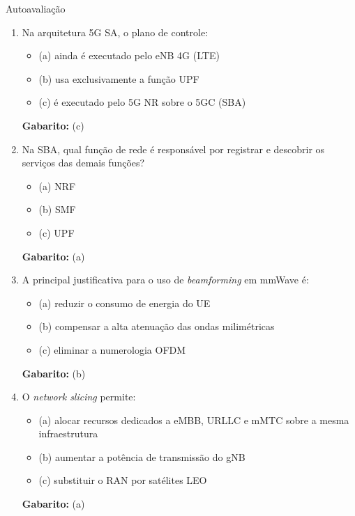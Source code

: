 \documentclass[aspectratio=169,11pt]{beamer}
\begin{document}
\begin{frame}{Autoavaliação}
  \begin{enumerate}
    \item Na arquitetura 5G SA, o plano de controle:
      \begin{itemize}
        \item (a) ainda é executado pelo eNB 4G (LTE)
        \item (b) usa exclusivamente a função UPF
        \item (c) é executado pelo 5G NR sobre o 5GC (SBA)
      \end{itemize}
      \pause
      \textbf{Gabarito:} (c)
    \item Na SBA, qual função de rede é responsável por registrar e descobrir os serviços das demais funções?
      \begin{itemize}
        \item (a) NRF
        \item (b) SMF
        \item (c) UPF
      \end{itemize}
      \pause
      \textbf{Gabarito:} (a)
    \item A principal justificativa para o uso de \emph{beamforming} em mmWave é:
      \begin{itemize}
        \item (a) reduzir o consumo de energia do UE
        \item (b) compensar a alta atenuação das ondas milimétricas
        \item (c) eliminar a numerologia OFDM
      \end{itemize}
      \pause
      \textbf{Gabarito:} (b)
    \item O \emph{network slicing} permite:
      \begin{itemize}
        \item (a) alocar recursos dedicados a eMBB, URLLC e mMTC sobre a mesma infraestrutura
        \item (b) aumentar a potência de transmissão do gNB
        \item (c) substituir o RAN por satélites LEO
      \end{itemize}
      \pause
      \textbf{Gabarito:} (a)
  \end{enumerate}
\end{frame}
\end{document}
